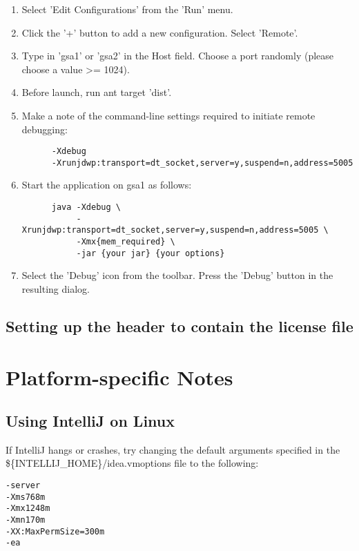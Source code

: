 \documentclass[11pt,fullpage]{article}
\begin{document}
\begin{enumerate}
  \item Select 'Edit Configurations' from the 'Run' menu.
  \item Click the '+' button to add a new configuration.  Select 'Remote'.
  \item Type in 'gsa1' or 'gsa2' in the Host field.  Choose a port randomly (please choose a value >= 1024).
  \item Before launch, run ant target 'dist'.
  \item Make a note of the command-line settings required to initiate remote debugging:
    \begin{verbatim}
      -Xdebug 
      -Xrunjdwp:transport=dt_socket,server=y,suspend=n,address=5005
    \end{verbatim}
  \item Start the application on gsa1 as follows:
    \begin{verbatim}
      java -Xdebug \
           -Xrunjdwp:transport=dt_socket,server=y,suspend=n,address=5005 \ 
           -Xmx{mem_required} \ 
           -jar {your jar} {your options}
    \end{verbatim}
  \item Select the 'Debug' icon from the toolbar.  Press the 'Debug' button in the resulting dialog.
\end{enumerate}

\subsection{Setting up the header to contain the license file}

\section{Platform-specific Notes}

\subsection{Using IntelliJ on Linux}
If IntelliJ hangs or crashes, try changing the default arguments specified in the \$\{INTELLIJ\_HOME\}/idea.vmoptions file to the following:

\begin{verbatim}
-server
-Xms768m
-Xmx1248m
-Xmn170m
-XX:MaxPermSize=300m
-ea
\end{verbatim}
\end{document}
